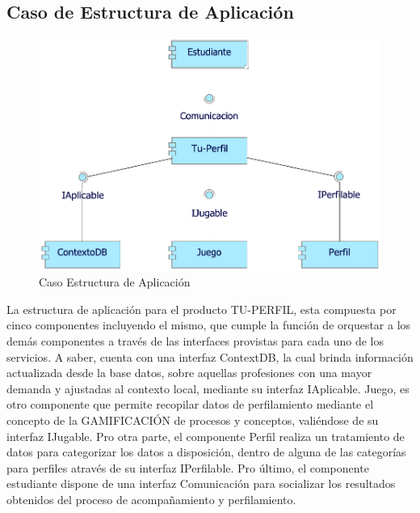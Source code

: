 \newpage

\subsection{Caso  de Estructura de Aplicación}
\begin{figure}[h!]
	\centering
	\includegraphics[width=.8\linewidth]{imgs/caso/aplicacion/estructura}
	\caption{Caso Estructura de Aplicación}
\end{figure}

La estructura de aplicación para el producto TU-PERFIL, esta compuesta por cinco componentes incluyendo el mismo, que cumple la función de orquestar a los demás componentes a través de las interfaces provistas para cada uno de los servicios. A saber, cuenta con una interfaz ContextDB, la cual brinda información actualizada desde la base datos, sobre aquellas profesiones con una mayor demanda y ajustadas al contexto local, mediante su interfaz IAplicable. Juego, es otro componente que permite recopilar datos de perfilamiento mediante el concepto de la GAMIFICACIÓN de procesos y conceptos, valiéndose de su interfaz IJugable. Pro otra parte, el componente Perfil realiza un tratamiento de datos para categorizar los datos a disposición, dentro de alguna de las categorías para perfiles através de su interfaz IPerfilable. Pro último, el componente estudiante dispone de una interfaz Comunicación para socializar los resultados obtenidos del proceso de acompañamiento y perfilamiento.

\newpage